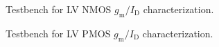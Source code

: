 \documentclass[
  a4paper,
  DIV=11,
  numbers=noendperiod]{scrartcl}
\begin{document}
\begin{figure}


\caption{\label{fig-techsweep-nmos-tb}Testbench for LV NMOS
\(g_\mathrm{m}/I_\mathrm{D}\) characterization.}

\end{figure}%

\begin{figure}


\caption{\label{fig-techsweep-pmos-tb}Testbench for LV PMOS
\(g_\mathrm{m}/I_\mathrm{D}\) characterization.}

\end{figure}%
\end{document}
